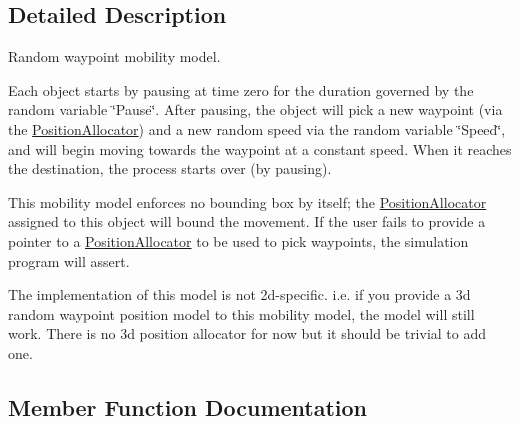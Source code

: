 \subsection{Detailed Description}
Random waypoint mobility model. 

Each object starts by pausing at time zero for the duration governed by the random variable \char`\"{}\+Pause\char`\"{}. After pausing, the object will pick a new waypoint (via the \hyperlink{classns3_1_1PositionAllocator}{Position\+Allocator}) and a new random speed via the random variable \char`\"{}\+Speed\char`\"{}, and will begin moving towards the waypoint at a constant speed. When it reaches the destination, the process starts over (by pausing).

This mobility model enforces no bounding box by itself; the \hyperlink{classns3_1_1PositionAllocator}{Position\+Allocator} assigned to this object will bound the movement. If the user fails to provide a pointer to a \hyperlink{classns3_1_1PositionAllocator}{Position\+Allocator} to be used to pick waypoints, the simulation program will assert.

The implementation of this model is not 2d-\/specific. i.\+e. if you provide a 3d random waypoint position model to this mobility model, the model will still work. There is no 3d position allocator for now but it should be trivial to add one. 

\subsection{Member Function Documentation}
